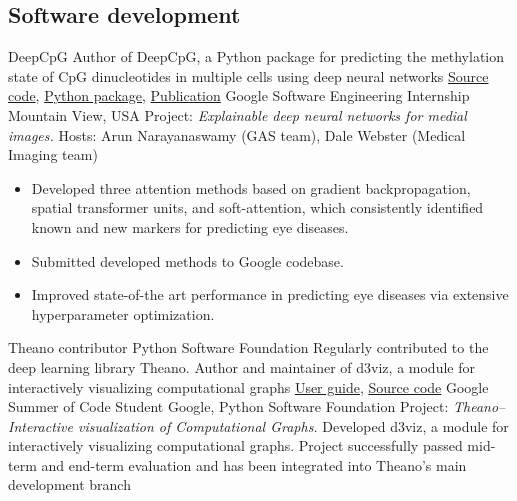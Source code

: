 \documentclass[11pt,a4paper]{moderncv}
\newcommand\chref[3][magenta]{\href{#2}{\small\color{#1}#3}}
\begin{document}
\subsection{Software development}
         {DeepCpG}
         {}
         {}
         {\hfill\break Author of DeepCpG, a Python package for predicting the methylation state of CpG dinucleotides in multiple cells using deep neural networks}
         {\chref{https://github.com/cangermueller/deepcpg}{Source code},
          \chref{https://pypi.python.org/pypi/deepcpg}{Python package},
          \chref{https://genomebiology.biomedcentral.com/articles/10.1186/s13059-017-1189-z}{Publication}}
         {Google Software Engineering Internship}
         {\hfill\break Mountain View, USA}
         {}
         {\hfill\break Project: \textit{Explainable deep neural networks for
           medial images.}
           \hfill\break Hosts: Arun Narayanaswamy (GAS team), Dale Webster (Medical Imaging team)}
         {\begin{itemize}
             \item Developed three attention methods based on gradient
               backpropagation, spatial transformer units, and soft-attention,
               which consistently identified known and new markers for predicting
               eye diseases.
             \item Submitted developed methods to Google codebase.
             \item Improved state-of-the art performance in predicting eye diseases via extensive hyperparameter optimization.
          \end{itemize}}
         {Theano contributor}
         {\hfill\break Python Software Foundation}
         {}
         {\hfill\break Regularly contributed to the deep learning library
           Theano. Author and maintainer of d3viz, a module for interactively
           visualizing computational graphs}
         {\chref{http://deeplearning.net/software/theano/library/d3viz/index.html}{User guide},
          \chref{https://github.com/Theano/Theano/tree/master/theano/d3viz}{Source code}
         }
         {Google Summer of Code Student}
         {\hfill\break Google, Python Software Foundation}
         {}
         {\hfill\break Project: \textit{Theano--Interactive visualization of Computational Graphs.}
          \hfill\break Developed d3viz, a module for interactively visualizing computational graphs. Project successfully passed mid-term and end-term evaluation and has been integrated into Theano's main development branch}
\end{document}
